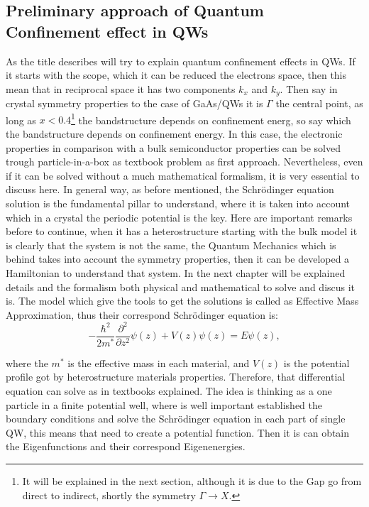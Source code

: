 \subsection{Preliminary approach of Quantum Confinement effect in QWs}
\label{subsection:chapter-1-preliminary-approach-of-quantum-confinment-effect-in-qws}
\vspace{-10mm} 
As the title describes will try to explain  quantum confinement effects in QWs. If  it starts with the  scope, which it can be reduced the electrons space, then this mean that in reciprocal space it has two components $k_{x}$ and $k_{y}$. Then say in crystal symmetry properties to the case of GaAs/\algaas QWs it is $\Gamma$ the central point, as long as $x < 0.4$\footnote{It will be explained in the next section, although it is due to the Gap go from direct to indirect, shortly the symmetry $\Gamma\to X$.} the bandstructure depends on confinement energ, so say which the bandstructure depends on confinement energy.  
In this case, the electronic properties in comparison with a bulk semiconductor properties can be solved trough particle-in-a-box as textbook problem as first approach. Nevertheless, even if it can be solved  without  a much mathematical formalism, it is very essential to discuss here. In general way, as before mentioned, the Schrödinger equation solution is the fundamental pillar to understand, where it is taken into account which  in a crystal the periodic potential is the key. Here are important remarks before to continue, when it has a heterostructure starting with the bulk model it is clearly that the system is not the same, the Quantum Mechanics which is behind takes into account the symmetry properties, then it can be developed a Hamiltonian  to understand that system.  In the next chapter will be explained details and the formalism both physical and mathematical to solve and discus it is. The model which give the tools to get the solutions is called as Effective Mass Approximation, thus their correspond Schrödinger equation is\cite{harrison2016quantum,chuang1995physics,singh2003electronic,bastard1990wave,fox2002optical,davies1998physics}: 
\begin{equation}\label{eq:chapter-1-ema-schroedinger}
	-\dfrac{\hbar^{2}}{2m^{*}}\dfrac{\partial^{2}}{\partial {z}^{2}}\psi(z)+V(z)\psi(z)=E\psi(z),
\end{equation}

where the $m^{*}$ is the effective mass in each material, and $V(z)$ is the potential profile got by heterostructure materials properties. Therefore, that differential equation can solve as in textbooks explained\cite{de2014introduccion,griffiths2018introduction,sakurai1995modern,cohen2019quantum,chuang1995physics,harrison2016quantum,fox2002optical,bastard1990wave}. The idea is thinking as a one particle in a finite potential well, where is well important established the boundary conditions and solve the Schrödinger equation in each part of single QW, this means that need to create a potential function. Then it is can obtain the Eigenfunctions and their correspond Eigenenergies.

